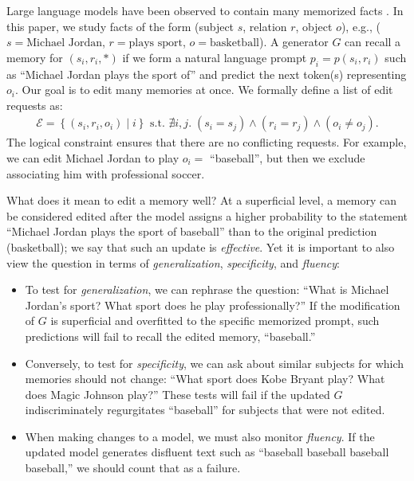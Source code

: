 \documentclass{article} %
\newcommand{\elid}[2]{#1_{#2}}
\newcommand{\lbleq}[1]{\label{eq:#1}}
\begin{document}
Large language models have been observed to contain many memorized facts \citep{petroni2020context, gpt3, jiang2020can, chowdhery2022palm}. In this paper, we study facts of the form (subject $s$, relation $r$, object $o$), e.g., ($s=\text{Michael Jordan}$, $r=\text{plays sport}$, $o=\text{basketball}$).
A generator $G$ can recall a memory for $(s_i, r_i, *)$ if we form a natural language prompt $p_i = p(s_i, r_i)$ such as ``Michael Jordan plays the sport of'' and predict the next token(s) representing $o_i$.
Our goal is to edit many memories at once. We formally define a list of edit requests as:
\begin{align}
    \mathcal{E} = \left\{ \left( \elid{s}{i}, \elid{r}{i}, \elid{o}{i} \right) \mid i \right\} \text{ s.t. } \nexists i, j.\; (\elid{s}{i} = \elid{s}{j}) \land (\elid{r}{i} = \elid{r}{j}) \land (\elid{o}{i} \neq \elid{o}{j}). \lbleq{edit-set}
\end{align}
The logical constraint ensures that there are no conflicting requests. For example, we can edit Michael Jordan to play $o_i=$ ``baseball'', but then we exclude associating him with professional soccer.

What does it mean to edit a memory well?  At a superficial level, a memory can be considered edited after the model assigns a higher probability to the statement ``Michael Jordan plays the sport of baseball'' than to the original prediction (basketball); we say that such an update is \emph{effective}.  Yet it is important to also view the question in terms of \textit{generalization}, \textit{specificity}, and \textit{fluency}:
\begin{itemize}[leftmargin=12pt,topsep=0pt,itemsep=1.5pt,parsep=0pt]
    \item To test for \textit{generalization}, we can rephrase the question: ``What is Michael Jordan's sport?  What sport does he play professionally?'' If the modification of $G$ is superficial and overfitted to the specific memorized prompt, such predictions will fail to recall the edited memory, ``baseball.''
    \item Conversely, to test for \textit{specificity}, we can ask about similar subjects for which memories should not change: ``What sport does Kobe Bryant play?  What does Magic Johnson play?''  These tests will fail if the updated $G$ indiscriminately regurgitates ``baseball'' for subjects that were not edited.
    \item When making changes to a model, we must also monitor \textit{fluency}. If the updated model generates disfluent text such as ``baseball baseball baseball baseball,'' we should count that as a failure.
\end{itemize}
\end{document}
